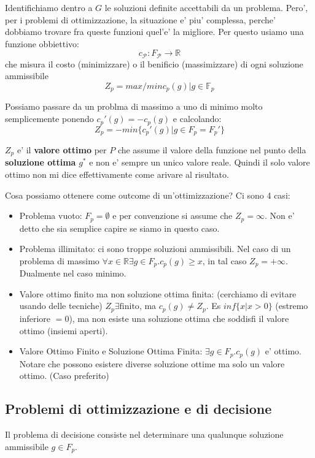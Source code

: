 \documentclass{report}
\begin{document}
Identifichiamo dentro a $ G $ le soluzioni definite accettabili da un problema. Pero', per i problemi di ottimizzazione, la situazione e' piu' complessa, perche' dobbiamo trovare fra queste funzioni quel'e' la migliore. Per questo usiamo una funzione obbiettivo:
\[
  c_{\mathcal{P}}: F_\mathcal{P} \to \mathbb{R}
\]
che misura il costo (minimizzare) o il benificio (massimizzare) di ogni soluzione ammissibile
\[
  Z_p = max/min{c_p(g) | g \in \mathbb{F}_p}
\]

Possiamo passare da un problma di massimo a uno di minimo molto semplicemente ponendo $ c_p'(g) = -c_p(g) $ e calcolando:
\[
  Z_p = - min \{c_p'(g) | g \in F_p = F_p'\}
\]

$ Z_p $ e' il \textbf{valore ottimo} per $ P $ che assume il valore della funzione nel punto della \textbf{soluzione ottima} $ g^* $ e non e' sempre un unico valore reale. Quindi il solo valore ottimo non mi dice effettivamente come arivare al risultato. 


Cosa possiamo ottenere come outcome di un'ottimizzazione? Ci sono 4 casi:
\begin{itemize}
\item Problema vuoto: $ F_p = \emptyset $ e per convenzione si assume che $ Z_p = \infty $. Non e' detto che sia semplice capire se siamo in questo caso.
\item Problema illimitato: ci sono troppe soluzioni ammissibili. Nel caso di un problema di massimo $ \forall x \in \mathbb{R} \exists g \in F_p. c_p(g) \geq x $, in tal caso $ Z_p = +\infty $. Dualmente nel caso minimo.
\item Valore ottimo finito ma non soluzione ottima finita: (cerchiamo di evitare usando delle tecniche) $ Z_p \exists \text{finito} $, ma $ c_p(g) \neq Z_p $. Es $ inf \{x | x > 0\} $ (estremo inferiore $ =0 $), ma non esiste una soluzione ottima che soddisfi il valore ottimo (insiemi aperti).
\item Valore Ottimo Finito e Soluzione Ottima Finita: $ \exists g \in F_p. c_p(g) $ e' ottimo. Notare che possono esistere diverse soluzione ottime ma solo un valore ottimo. (Caso preferito)
\end{itemize}

\subsection{Problemi di ottimizzazione e di decisione}
Il problema di decisione consiste nel determinare una qualunque soluzione ammissibile $ g \in F_p $. 
\end{document}
